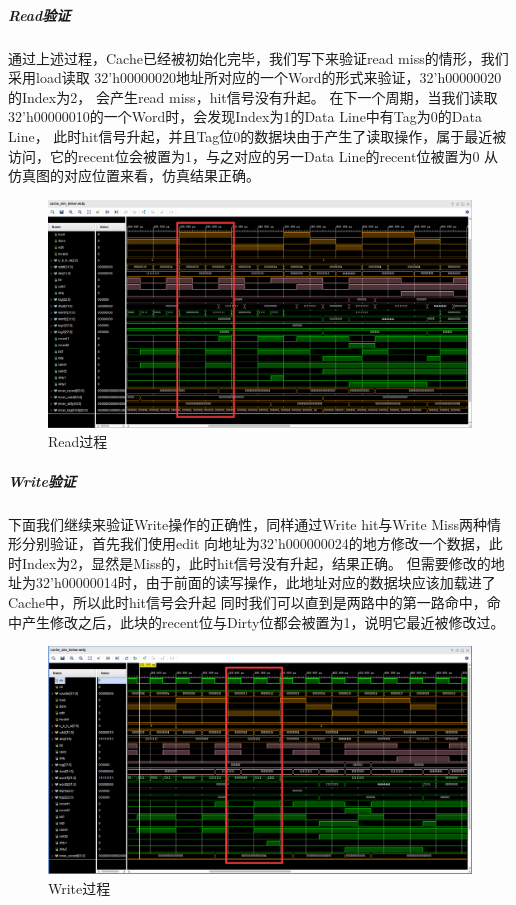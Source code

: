 \subparagraph{Read验证}
通过上述过程，Cache已经被初始化完毕，我们写下来验证read miss的情形，我们采用load读取
32'h00000020地址所对应的一个Word的形式来验证，32'h00000020的Index为2，
会产生read miss，hit信号没有升起。
在下一个周期，当我们读取32'h00000010的一个Word时，会发现Index为1的Data Line中有Tag为0的Data Line，
此时hit信号升起，并且Tag位0的数据块由于产生了读取操作，属于最近被访问，它的recent位会被置为1，与之对应的另一Data Line的recent位被置为0
从仿真图的对应位置来看，仿真结果正确。

\begin{figure}[H] %
	\centering %
	\includegraphics[width=1.0\textwidth]{figs/res3.png} %
	\caption{Read过程} %
	\label{Fig.4} %
\end{figure}

\subparagraph{Write验证}
下面我们继续来验证Write操作的正确性，同样通过Write hit与Write Miss两种情形分别验证，首先我们使用edit
向地址为32'h000000024的地方修改一个数据，此时Index为2，显然是Miss的，此时hit信号没有升起，结果正确。
但需要修改的地址为32'h00000014时，由于前面的读写操作，此地址对应的数据块应该加载进了Cache中，所以此时hit信号会升起
同时我们可以直到是两路中的第一路命中，命中产生修改之后，此块的recent位与Dirty位都会被置为1，说明它最近被修改过。

\begin{figure}[H] %
	\centering %
	\includegraphics[width=1.0\textwidth]{figs/res4.png} %
	\caption{Write过程} %
	\label{Fig.5} %
\end{figure}

